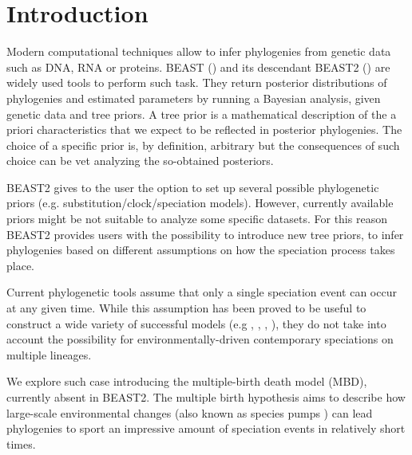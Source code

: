 \section{Introduction}

Modern computational techniques allow to infer phylogenies from genetic data 
such as DNA, RNA or proteins. BEAST (\cite{beast}) and its descendant 
BEAST2 (\cite{beast2}) are widely used tools to perform such task. They 
return posterior distributions of phylogenies and estimated parameters by running a Bayesian analysis, given genetic data and tree priors. A tree prior is a mathematical description of the a priori characteristics that we expect to be reflected in posterior phylogenies. The choice of a specific prior is, by definition, arbitrary but the consequences of such choice can be vet analyzing the so-obtained posteriors.

BEAST2 gives to the user the option to set up several possible phylogenetic priors (e.g. substitution/clock/speciation models). However, currently available priors might be not suitable to analyze some specific datasets.
For this reason BEAST2 provides users with the possibility to introduce new tree priors, to infer phylogenies based on different assumptions on how the speciation process takes place.

Current phylogenetic tools assume that only a single speciation event can occur at any given time.
While this assumption has been proved to be useful to construct a wide variety of successful models (e.g \cite{Maddison2007biSSE}, \cite{Valente2015}, \cite{etienne2012diversity}, \cite{etienne2014estimating}), they do not take into account the possibility for environmentally-driven contemporary speciations on multiple lineages.

We explore such case introducing the multiple-birth death model (MBD), currently absent in BEAST2. The multiple birth hypothesis aims to describe how large-scale environmental changes (also known as species pumps ) can lead phylogenies to sport an impressive amount of speciation events in relatively short times.

\iffalse
\giovanni{This might be good for the abstract}
The (constant-rate) birth-death (BD) model embodies the common assumption that only a single speciation event can occur at any given time. The multiple-birth-death (MBD) model relaxes this assumption allowing, in addition to standard BD events, also events in which large-scale environmental changes lead to speciation bursts.
\fi

